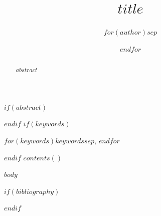 \documentclass[$for(classoption)$$classoption$$sep$,$endfor$]{IEEEtran}
\begin{document}
\title{$title$}
\author{$for(author)$$sep$
\and
$endfor$}
\maketitle
$if(abstract)$
\begin{abstract}
$abstract$
\end{abstract}
$endif$
$if(keywords)$
\begin{IEEEkeywords}
$for(keywords)$$keywords$$sep$, $endfor$
\end{IEEEkeywords}
$endif$
$contents()$

$body$

$if(bibliography)$


$endif$
\end{document}

